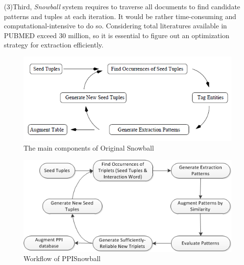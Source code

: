 (3)Third, \emph{Snowball} system requires to traverse all documents to find candidate patterns and tuples at each iteration. It would be rather time-consuming and computational-intensive to do so. Considering total literatures available in PUBMED exceed 30 million, so it is essential to figure out an optimization strategy for extraction efficiently.\\

\begin{figure}
\centering
\includegraphics[totalheight=1.4in]{fig/figure1.png}
\caption{The main components of Original Snowball}
\label{fig:snowball}
\end{figure}

\begin{figure}
\centering
\includegraphics[totalheight=1.6in]{fig/figure2.png}
\caption{Workflow of PPISnowball}
\label{fig:ppisnowball}
\end{figure}
